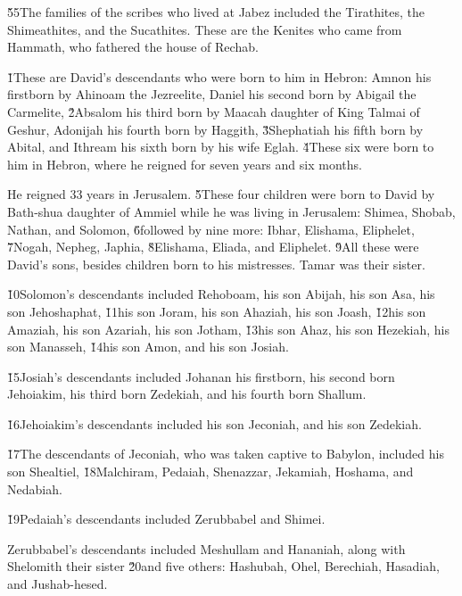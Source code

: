 \v{55}The families of the scribes who lived at Jabez included the Tirathites, the Shimeathites, and the Sucathites. These are the Kenites who came from Hammath, who fathered the house of Rechab.

\v{1}These are David's descendants who were born to him in Hebron: Amnon his firstborn by Ahinoam the Jezreelite, Daniel his second born by Abigail the Carmelite, \v{2}Absalom his third born by Maacah daughter of King Talmai of Geshur, Adonijah his fourth born by Haggith, \v{3}Shephatiah his fifth born by Abital, and Ithream his sixth born by his wife Eglah. \v{4}These six were born to him in Hebron, where he reigned for seven years and six months.

He reigned 33 years in Jerusalem. \v{5}These four children were born to David by Bath-shua daughter of Ammiel while he was living in Jerusalem: Shimea, Shobab, Nathan, and Solomon, \v{6}followed by nine more: Ibhar, Elishama, Eliphelet, \v{7}Nogah, Nepheg, Japhia, \v{8}Elishama, Eliada, and Eliphelet. \v{9}All these were David's sons, besides children born to his mistresses. Tamar was their sister.

\v{10}Solomon's descendants included Rehoboam, his son Abijah, his son Asa, his son Jehoshaphat, \v{11}his son Joram, his son Ahaziah, his son Joash, \v{12}his son Amaziah, his son Azariah, his son Jotham, \v{13}his son Ahaz, his son Hezekiah, his son Manasseh, \v{14}his son Amon, and his son Josiah.

\v{15}Josiah's descendants included Johanan his firstborn, his second born Jehoiakim, his third born Zedekiah, and his fourth born Shallum.

\v{16}Jehoiakim's descendants included his son Jeconiah, and his son Zedekiah.

\v{17}The descendants of Jeconiah, who was taken captive to Babylon, included his son Shealtiel, \v{18}Malchiram, Pedaiah, Shenazzar, Jekamiah, Hoshama, and Nedabiah.

\v{19}Pedaiah's descendants included Zerubbabel and Shimei.

Zerubbabel's descendants included Meshullam and Hananiah, along with Shelomith their sister \v{20}and five others: Hashubah, Ohel, Berechiah, Hasadiah, and Jushab-hesed.

